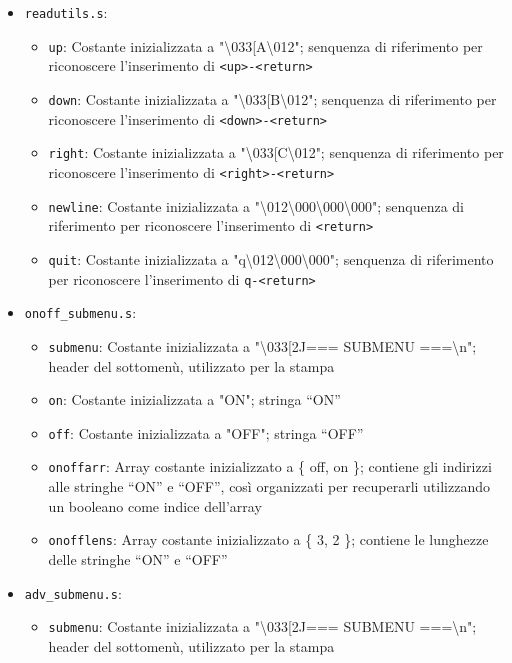 \documentclass[
  12pt,
  a4paper,
  headings=optiontoheadandtoc
]{scrreprt}
\begin{document}
\begin{itemize}
\begin{itemize}
  \end{itemize}
\item \texttt{readutils.s}:
  \begin{itemize}
    \item \texttt{up}: Costante inizializzata a "\textbackslash033[A\textbackslash012"; senquenza di riferimento per riconoscere l'inserimento di \texttt{<up>-<return>}
    \item \texttt{down}: Costante inizializzata a "\textbackslash033[B\textbackslash012"; senquenza di riferimento per riconoscere l'inserimento di \texttt{<down>-<return>}
    \item \texttt{right}: Costante inizializzata a "\textbackslash033[C\textbackslash012"; senquenza di riferimento per riconoscere l'inserimento di \texttt{<right>-<return>}
    \item \texttt{newline}: Costante inizializzata a "\textbackslash012\textbackslash000\textbackslash000\textbackslash000"; senquenza di riferimento per riconoscere l'inserimento di \texttt{<return>}
    \item \texttt{quit}: Costante inizializzata a "q\textbackslash012\textbackslash000\textbackslash000"; senquenza di riferimento per riconoscere l'inserimento di \texttt{q-<return>}
  \end{itemize}
\item \texttt{onoff\_submenu.s}:
  \begin{itemize}
    \item \texttt{submenu}: Costante inizializzata a "\textbackslash033[2J=== SUBMENU ===\textbackslash{}n"; header del sottomenù, utilizzato per la stampa
    \item \texttt{on}: Costante inizializzata a "ON"; stringa ``ON''
    \item \texttt{off}: Costante inizializzata a "OFF"; stringa ``OFF''
    \item \texttt{onoffarr}: Array costante inizializzato a \{ off, on \}; contiene gli indirizzi alle stringhe ``ON'' e ``OFF'', così organizzati per recuperarli utilizzando un booleano come indice dell'array
    \item \texttt{onofflens}: Array costante inizializzato a \{ 3, 2 \}; contiene le lunghezze delle stringhe ``ON'' e ``OFF''
  \end{itemize}
\item \texttt{adv\_submenu.s}:
  \begin{itemize}
    \item \texttt{submenu}: Costante inizializzata a "\textbackslash033[2J=== SUBMENU ===\textbackslash{}n"; header del sottomenù, utilizzato per la stampa

\end{itemize}
\end{itemize}
\end{document}

